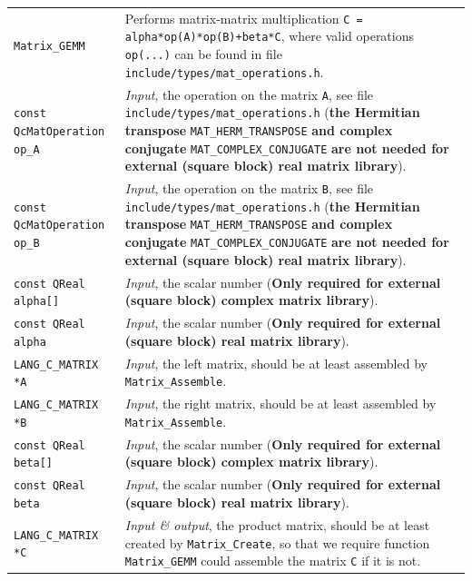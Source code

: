 \documentclass[a4paper,11pt,twoside,openright]{book}
\begin{document}
\begin{center}
\begin{longtable}{l|p{}}
    \hline
%
    \verb|Matrix_GEMM|\index{\texttt{Matrix\_GEMM}} %
      & Performs matrix-matrix multiplication \verb|C = alpha*op(A)*op(B)+beta*C|,
        where valid operations \verb|op(...)| can be found in file
        \verb|include/types/mat_operations.h|.\\
    \hspace*{2ex}\verb|const QcMatOperation op_A| %
      & \textsl{Input}, the operation on the matrix \verb|A|, see file
        \verb|include/types/mat_operations.h| (\textbf{the Hermitian transpose}
        \verb|MAT_HERM_TRANSPOSE| \textbf{and complex conjugate}
        \verb|MAT_COMPLEX_CONJUGATE| \textbf{are not needed for external (square block)
        real matrix library}).\\
    \hspace*{2ex}\verb|const QcMatOperation op_B| %
      & \textsl{Input}, the operation on the matrix \verb|B|, see file
        \verb|include/types/mat_operations.h| (\textbf{the Hermitian transpose}
        \verb|MAT_HERM_TRANSPOSE| \textbf{and complex conjugate}
        \verb|MAT_COMPLEX_CONJUGATE| \textbf{are not needed for external (square block)
        real matrix library}).\\
    \hspace*{2ex}\verb|const QReal alpha[]| %
      & \textsl{Input}, the scalar number %
        (\textbf{Only required for external (square block) complex matrix library}).\\
    \hspace*{2ex}\verb|const QReal alpha| %
      & \textsl{Input}, the scalar number %
        (\textbf{Only required for external (square block) real matrix library}).\\
    \hspace*{2ex}\verb|LANG_C_MATRIX *A| %
      & \textsl{Input}, the left matrix, should be at least assembled
        by \verb|Matrix_Assemble|.\\
    \hspace*{2ex}\verb|LANG_C_MATRIX *B| %
      & \textsl{Input}, the right matrix, should be at least assembled
        by \verb|Matrix_Assemble|.\\
    \hspace*{2ex}\verb|const QReal beta[]| %
      & \textsl{Input}, the scalar number %
        (\textbf{Only required for external (square block) complex matrix library}).\\
    \hspace*{2ex}\verb|const QReal beta| %
      & \textsl{Input}, the scalar number %
        (\textbf{Only required for external (square block) real matrix library}).\\
    \hspace*{2ex}\verb|LANG_C_MATRIX *C| %
      & \textsl{Input \& output}, the product matrix, should be at least created
        by \verb|Matrix_Create|, so that we require function \verb|Matrix_GEMM|
        could assemble the matrix \verb|C| if it is not.
%
  \end{longtable}
\end{center}
\vspace*{-5ex}
\end{document}
